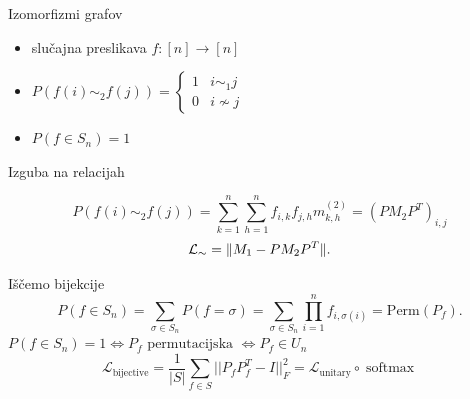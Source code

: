 \begin{frame}{\color{aoblue} Izomorfizmi grafov}
\begin{itemize}
    \item slučajna preslikava $f \colon [n] \to [n]$ %
    \item  $P(f(i) \sim_2 f(j)) = 
    \begin{cases}
1 & i \sim_1 j \\
0 & i \not\sim j
    \end{cases}$ 
    \item $P(f  \in S_n) = 1$ 
\end{itemize}    

\end{frame}
\begin{frame}{\color{aoblue}Izguba na relacijah}
 
$$
P(f(i) \sim_2 f(j)) = \sum_{k= 1}^n \sum_{h = 1}^n f_{i, k} f_{j, h} m_{k,h}^{(2)} 
= (P M_2 P^T)_{i, j}
$$  
$$
 \mathcal L_\sim = \|M_1 - P M_2 P^T\|.
$$
\end{frame}
\begin{frame}{\color{aoblue}Iščemo bijekcije}
  $$
  P(f \in S_n )= \sum_{\sigma \in S_n} P(f = \sigma) = \sum_{\sigma
  \in S_n}   \prod_{i=1}^n f_{i, \sigma(i)}
  = \text{Perm} (P_f).
  $$
  $P(f \in S_n ) = 1 \iff P_f \text{ permutacijska }\iff P_f \in U_n$
  \vfill
  $$
  \mathcal{L}_{\text{bijective}} = \frac{1}{|S|} \sum_{f \in
  S}||P_fP_f^T - I||_F^2  = \mathcal{L}_{\text{unitary}} \circ
  \operatorname{softmax}
  $$
\end{frame}

